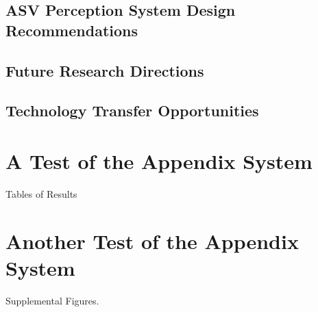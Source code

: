 \documentclass{erauthesis}
\begin{document}
\section{ASV Perception System Design Recommendations}

\section{Future Research Directions}

\section{Technology Transfer Opportunities}





% 


\backmatter

\chapter{A Test of the Appendix System}

Tables of Results

\chapter{Another Test of the Appendix System}
Supplemental Figures.
\end{document}
